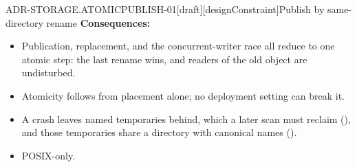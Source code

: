 \begin{requirement}{ADR-STORAGE.ATOMICPUBLISH-01}[draft][designConstraint]{Publish by same-directory rename}
  \textbf{Consequences:}
  \begin{itemize}
    \item[+] Publication, replacement, and the concurrent-writer race all
      reduce to one atomic step: the last rename wins, and readers of the old
      object are undisturbed.
    \item[+] Atomicity follows from placement alone; no deployment setting
      can break it.
    \item[--] A crash leaves named temporaries behind, which a later scan must
      reclaim (), and those temporaries share a
      directory with canonical names ().
    \item[--] POSIX-only.
  \end{itemize}



\end{requirement}

